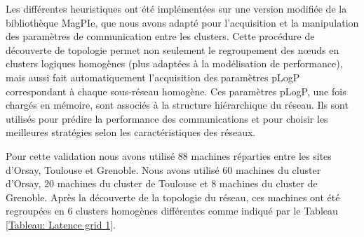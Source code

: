 Les différentes heuristiques ont été implémentées sur une version modifiée
de la bibliothèque MagPIe, que nous avons adapté pour l'acquisition
et la manipulation des paramètres de communication entre les  clusters. Cette procédure de
découverte de topologie permet non seulement le regroupement des n{\oe}uds
en clusters logiques homogènes (plus adaptées à la modélisation de
performance), mais aussi fait automatiquement l'acquisition des paramètres
pLogP correspondant à chaque sous-réseau homogène. Ces paramètres
pLogP, une fois chargés en mémoire, sont associés à la structure hiérarchique
du réseau. Ils sont utilisés pour prédire la performance des communications et pour choisir les meilleures
stratégies selon les caractéristiques des réseaux.

Pour cette validation nous avons utilisé 88 machines réparties entre les sites
d'Orsay, Toulouse et Grenoble. Nous avons utilisé 60 machines
du  cluster d'Orsay, 20 machines du  cluster de Toulouse et
8 machines du  cluster de Grenoble. Après la découverte de la topologie du réseau, ces machines ont été regroupées en 6
clusters homogènes différentes comme indiqué par le Tableau \ref{Tableau: Latence grid 1}. 

